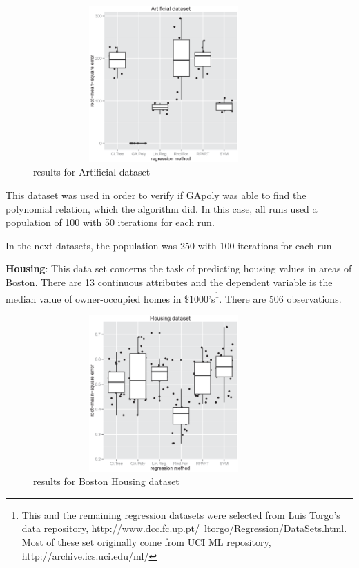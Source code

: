 \documentclass[a4paper, 12pt]{article}
\begin{document}
\begin{figure}[htb]
	\begin{center}
		\includegraphics[height=6cm,width=10cm,angle=0]
			{figures/artificial_dataset1_lambda1.0.eps}
		\caption{results for Artificial dataset}
	\end{center}
\end{figure}

This dataset was used in order to verify if GApoly was able to find the polynomial relation, which the algorithm did. In this case, all runs used a population of 100 with 50 iterations for each run.

In the next datasets, the population was 250 with 100 iterations for each run

\textbf{Housing}: This data set concerns the task of predicting housing values in areas of Boston. There are 13 continuous attributes and the dependent variable is the median value of owner-occupied homes in \$1000's\footnote{This and the remaining regression datasets were selected from Luis Torgo's data repository, http://www.dcc.fc.up.pt/~ltorgo/Regression/DataSets.html. Most of these set originally come from UCI ML repository, http://archive.ics.uci.edu/ml/}. There are 506 observations.

\begin{figure}[htb]
	\begin{center}
		\includegraphics[height=6cm,width=10cm,angle=0]
			{figures/Housing_dataset_lambda0.8_25runs.eps}
		\caption{results for Boston Housing dataset}
	\end{center}
\end{figure}
\end{document}
